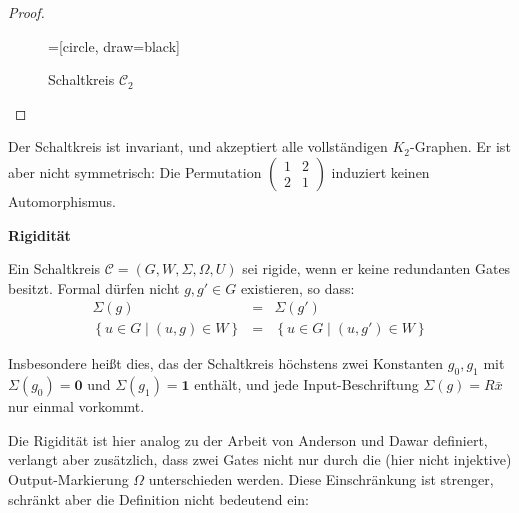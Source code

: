 \begin{proof}
\begin{figure}
\begin{centering}
\begin{center}
=[circle, draw=black]
\par\end{center}
\par\end{centering}
\caption{\label{fig:symm}Schaltkreis $\mathcal{C}_{2}$}
\end{figure}
\end{proof}
Der Schaltkreis ist invariant, und akzeptiert alle vollständigen $K_{2}$-Graphen.
Er ist aber nicht symmetrisch: Die Permutation $\left(\begin{array}{cc}
1 & 2\\
2 & 1
\end{array}\right)$ induziert keinen Automorphismus.

\begin{defn}
\textbf{\label{def:rigid}Rigidität}

Ein Schaltkreis $\mathcal{C}=\left(G,W,\Sigma,\Omega,U\right)$ sei
rigide, wenn er keine redundanten Gates besitzt. Formal dürfen nicht
$g,g'\in G$ existieren, so dass:
\begin{eqnarray*}
\Sigma\left(g\right) & = & \Sigma\left(g'\right)\\
\left\{ u\in G\mid\left(u,g\right)\in W\right\}  & = & \left\{ u\in G\mid\left(u,g'\right)\in W\right\} 
\end{eqnarray*}

Insbesondere heißt dies, das der Schaltkreis höchstens zwei Konstanten
$g_{0},g_{1}$ mit $\Sigma\left(g_{0}\right)=\mathbf{0}$ und $\Sigma\left(g_{1}\right)=\mathbf{1}$
enthält, und jede Input-Beschriftung $\Sigma\left(g\right)=R\bar{x}$
nur einmal vorkommt.
\end{defn}
Die Rigidität ist hier analog zu der Arbeit von Anderson und Dawar\cite{AD2014}
definiert, verlangt aber zusätzlich, dass zwei Gates nicht nur durch
die (hier nicht injektive) Output-Markierung $\Omega$ unterschieden
werden. Diese Einschränkung ist strenger, schränkt aber die Definition
nicht bedeutend ein:

